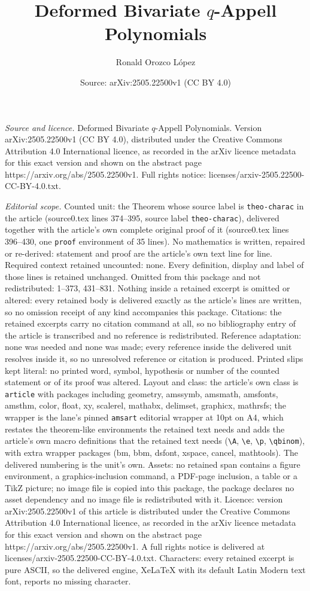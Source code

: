 \documentclass[10pt,a4paper]{amsart}
\title[Deformed Bivariate $q$-Appell Polynomials]{Deformed Bivariate $q$-Appell Polynomials}
\author{Ronald Orozco L\'opez}
\date{Source: arXiv:2505.22500v1 (CC BY 4.0)}
\begin{document}
\maketitle

\noindent\emph{Source and licence.} Deformed Bivariate $q$-Appell Polynomials. Version arXiv:2505.22500v1 (CC BY 4.0), distributed under the Creative Commons Attribution 4.0 International licence, as recorded in the arXiv licence metadata for this exact version and shown on the abstract page https://arxiv.org/abs/2505.22500v1. Full rights notice: licenses/arxiv-2505.22500-CC-BY-4.0.txt.\par\smallskip

\noindent\textit{Editorial scope.} Counted unit: the Theorem whose source label is \texttt{theo-charac} in the article (source0.tex lines 374--395, source label \texttt{theo-charac}), delivered together with the article's own complete original proof of it (source0.tex lines 396--430, one \texttt{proof} environment of 35 lines). No mathematics is written, repaired or re-derived: statement and proof are the article's own text line for line. Required context retained uncounted: none. Every definition, display and label of those lines is retained unchanged. Omitted from this package and not redistributed: 1--373, 431--831. Nothing inside a retained excerpt is omitted or altered: every retained body is delivered exactly as the article's lines are written, so no omission receipt of any kind accompanies this package. Citations: the retained excerpts carry no citation command at all, so no bibliography entry of the article is transcribed and no reference is redistributed. Reference adaptation: none was needed and none was made; every reference inside the delivered unit resolves inside it, so no unresolved reference or citation is produced. Printed slips kept literal: no printed word, symbol, hypothesis or number of the counted statement or of its proof was altered. Layout and class: the article's own class is \texttt{article} with packages including geometry, amssymb, amsmath, amsfonts, amsthm, color, float, xy, scalerel, mathabx, delimset, graphicx, mathrsfs; the wrapper is the lane's pinned \texttt{amsart} editorial wrapper at 10pt on A4, which restates the theorem-like environments the retained text needs and adds the article's own macro definitions that the retained text needs (\texttt{\textbackslash A}, \texttt{\textbackslash e}, \texttt{\textbackslash p}, \texttt{\textbackslash qbinom}), with extra wrapper packages (bm, bbm, dsfont, xspace, cancel, mathtools). The delivered numbering is the unit's own. Assets: no retained span contains a figure environment, a graphics-inclusion command, a PDF-page inclusion, a table or a TikZ picture; no image file is copied into this package, the package declares no asset dependency and no image file is redistributed with it. Licence: version arXiv:2505.22500v1 of this article is distributed under the Creative Commons Attribution 4.0 International licence, as recorded in the arXiv licence metadata for this exact version and shown on the abstract page https://arxiv.org/abs/2505.22500v1. A full rights notice is delivered at licenses/arxiv-2505.22500-CC-BY-4.0.txt. Characters: every retained excerpt is pure ASCII, so the delivered engine, XeLaTeX with its default Latin Modern text font, reports no missing character.
\end{document}
